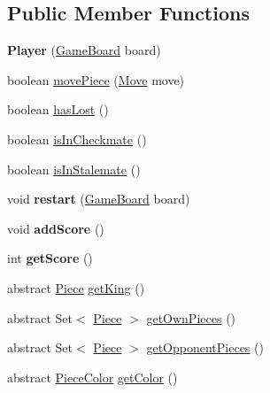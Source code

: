 \subsection*{Public Member Functions}
\begin{DoxyCompactItemize}
\item 
\mbox{\label{classplayers_1_1_player_ab00ac82acff3bd9f2f2c3a16f8f642ba}} 
{\bfseries Player} (\mbox{\hyperlink{classgameboard_1_1_game_board}{Game\+Board}} board)
\item 
boolean \mbox{\hyperlink{classplayers_1_1_player_ad9049a1cec91bf5214100286f984cdaa}{move\+Piece}} (\mbox{\hyperlink{classpieces_1_1_move}{Move}} move)
\item 
boolean \mbox{\hyperlink{classplayers_1_1_player_a410730e0aede2a7253250ac892fc02e7}{has\+Lost}} ()
\item 
boolean \mbox{\hyperlink{classplayers_1_1_player_a5dc5f954097bc57cb2b1a63e1d32d00e}{is\+In\+Checkmate}} ()
\item 
boolean \mbox{\hyperlink{classplayers_1_1_player_ad7d20950f08db802354df71058addc8f}{is\+In\+Stalemate}} ()
\item 
\mbox{\label{classplayers_1_1_player_a591346f361d949a7bbd825a4d764597e}} 
void {\bfseries restart} (\mbox{\hyperlink{classgameboard_1_1_game_board}{Game\+Board}} board)
\item 
\mbox{\label{classplayers_1_1_player_a8461737a9f089305a750d4ef19992007}} 
void {\bfseries add\+Score} ()
\item 
\mbox{\label{classplayers_1_1_player_adb7c0bb6e8c72d9e16c333ef9e389ca2}} 
int {\bfseries get\+Score} ()
\item 
abstract \mbox{\hyperlink{classpieces_1_1_piece}{Piece}} \mbox{\hyperlink{classplayers_1_1_player_a7a8d0f9a4ff654c5e1d936c8069d39ca}{get\+King}} ()
\item 
abstract Set$<$ \mbox{\hyperlink{classpieces_1_1_piece}{Piece}} $>$ \mbox{\hyperlink{classplayers_1_1_player_af1c0e492177ecbfa6bdc8e44b968ead3}{get\+Own\+Pieces}} ()
\item 
abstract Set$<$ \mbox{\hyperlink{classpieces_1_1_piece}{Piece}} $>$ \mbox{\hyperlink{classplayers_1_1_player_a71b0707e3607a9fdc2d8b94b49be1394}{get\+Opponent\+Pieces}} ()
\item 
abstract \mbox{\hyperlink{enumpieces_1_1_piece_1_1_piece_color}{Piece\+Color}} \mbox{\hyperlink{classplayers_1_1_player_a806f2042576092dced6bf5b9600f7763}{get\+Color}} ()
\end{DoxyCompactItemize}
